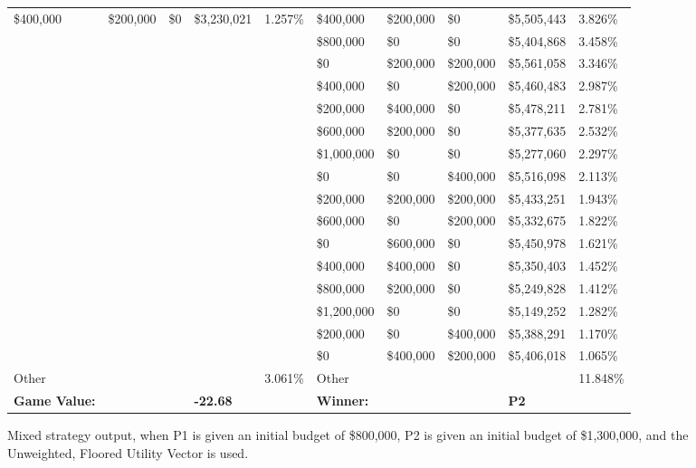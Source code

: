 \documentclass[11pt]{article}
\begin{document}
\begin{figure}
\begin{tabular}{ |p{1.0cm}p{1.0cm}p{1.0cm}p{2.0cm}|p{1.0cm}||p{1.0cm}p{1.0cm}p{1.0cm}p{2.0cm}|p{1.0cm}|}
\$400,000 & \$200,000 & \$0 & \$3,230,021 & 1.257\% & \$400,000 & \$200,000 & \$0 & \$5,505,443 & 3.826\% \\
& & & &                                            & \$800,000 & \$0 & \$0 & \$5,404,868 & 3.458\% \\
& & & &                                            & \$0 & \$200,000 & \$200,000 & \$5,561,058 & 3.346\% \\
& & & &                                            & \$400,000 & \$0 & \$200,000 & \$5,460,483 & 2.987\% \\
& & & &                                            & \$200,000 & \$400,000 & \$0 & \$5,478,211 & 2.781\% \\
& & & &                                            & \$600,000 & \$200,000 & \$0 & \$5,377,635 & 2.532\% \\
& & & &                                            & \$1,000,000 & \$0 & \$0 & \$5,277,060 & 2.297\% \\
& & & &                                            & \$0 & \$0 & \$400,000 & \$5,516,098 & 2.113\% \\
& & & &                                            & \$200,000 & \$200,000 & \$200,000 & \$5,433,251 & 1.943\% \\
& & & &                                            & \$600,000 & \$0 & \$200,000 & \$5,332,675 & 1.822\% \\
& & & &                                            & \$0 & \$600,000 & \$0 & \$5,450,978 & 1.621\% \\
& & & &                                            & \$400,000 & \$400,000 & \$0 & \$5,350,403 & 1.452\% \\
& & & &                                            & \$800,000 & \$200,000 & \$0 & \$5,249,828 & 1.412\% \\
& & & &                                            & \$1,200,000 & \$0 & \$0 & \$5,149,252 & 1.282\% \\
& & & &                                            & \$200,000 & \$0 & \$400,000 & \$5,388,291 & 1.170\% \\
& & & &                                            & \$0 & \$400,000 & \$200,000 & \$5,406,018 & 1.065\% \\
\hline
Other & & & & 3.061\%                               & Other & & & & 11.848\% \\
\hline
\small \textbf{Game Value:} &&& \small \textbf{-22.68} && \small \textbf{Winner:} &&& \small \textbf{P2}&\\
\hline
\end{tabular}
\caption{Mixed strategy output, when P1 is given an initial budget of \$800,000, P2 is given an initial budget of \$1,300,000, and the Unweighted, Floored Utility Vector is used.}
\label{8v13table.1}
\end{figure}
\end{document}
